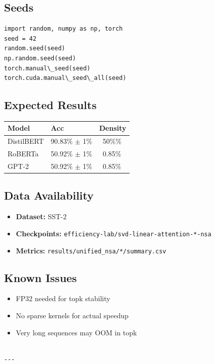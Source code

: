 \subsection{Seeds}

\begin{lstlisting}
import random, numpy as np, torch
seed = 42
random.seed(seed)
np.random.seed(seed)
torch.manual\_seed(seed)
torch.cuda.manual\_seed\_all(seed)
\end{lstlisting}

\subsection{Expected Results}

\begin{table}[H]
\centering
\small
\begin{tabular}{lll}
\toprule
\textbf{Model} & \textbf{Acc} & \textbf{Density} \\
\midrule
DistilBERT & 90.83\% $\pm$ 1\% & ~50\%\% \\
RoBERTa & 50.92\% $\pm$ 1\% & ~0.85\% \\
GPT-2 & 50.92\% $\pm$ 1\% & ~0.85\% \\
\bottomrule
\end{tabular}
\end{table}

\subsection{Data Availability}

\begin{itemize}
\item \textbf{Dataset:} SST-2
\item \textbf{Checkpoints:} \texttt{efficiency-lab/svd-linear-attention-*-nsa}
\item \textbf{Metrics:} \texttt{results/unified\_nsa/*/summary.csv}

\end{itemize}
\subsection{Known Issues}

\begin{itemize}
\item FP32 needed for topk stability
\item No sparse kernels for actual speedup
\item Very long sequences may OOM in topk
\end{itemize}
\begin{lstlisting}

---
\end{lstlisting}